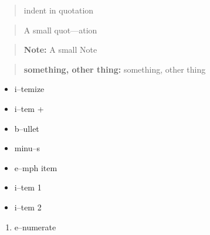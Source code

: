 \documentclass{book}
\begin{document}
\begin{quote}
indent in quotation
\end{quote}

\begin{quote}
\begin{footnotesize}
A small quot---ation
\end{footnotesize}
\end{quote}

\begin{quote}
\begin{footnotesize}
\textbf{Note:} A small Note
\end{footnotesize}
\end{quote}

\begin{quote}
\begin{footnotesize}
\textbf{something, other thing:} something, other thing
\end{footnotesize}
\end{quote}

\begin{itemize}
\item i--temize
\end{itemize}

\begin{itemize}[label=+]
\item i--tem +
\end{itemize}

\begin{itemize}[label=\textbullet{}]
\item b--ullet
\end{itemize}

\begin{itemize}[label=-]
\item minu--s
\end{itemize}

\begin{itemize}[label=\emph{after emph}]
\item e--mph item
\end{itemize}

\begin{itemize}[label=\textbullet{} a--n itemize line]
\item {}%
i--tem 1
\item i--tem 2
\end{itemize}

\begin{enumerate}[start=1]
\item e--numerate
\end{enumerate}
\end{document}
